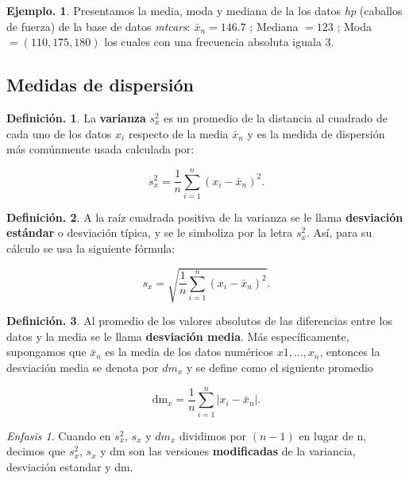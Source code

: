\documentclass[]{book}
\theoremstyle{definition}
\newtheorem{definition}{Definición.}[chapter]
\theoremstyle{definition}
\newtheorem{example}{Ejemplo.}[chapter]
\theoremstyle{definition}
\theoremstyle{remark}
\newtheorem*{remark}{Enfasis}
\begin{document}
\begin{example}
\protect\hypertarget{exm:unnamed-chunk-57}{}{\label{exm:unnamed-chunk-57} }Presentamos la media, moda y mediana de la los datos
\emph{hp} (caballos de fuerza) de la base de datos
\emph{mtcars}: \(\bar{x}_n= 146.7\) ; Mediana \(= 123\) ; Moda
\(=(110, 175, 180)\) los cuales con una
frecuencia absoluta iguala \(3\).
\end{example}

\hypertarget{medidas-de-dispersiuxf3n}{%
\subsection{Medidas de dispersión}\label{medidas-de-dispersiuxf3n}}

\begin{definition}
\protect\hypertarget{def:unnamed-chunk-58}{}{\label{def:unnamed-chunk-58} }
La \textbf{varianza} \(s_x^2\) es un promedio de la distancia
al cuadrado de cada uno de los
datos \(x_i\) respecto de la media \(\bar{x}_n\) y es la
medida de dispersión más comúnmente
usada calculada por:

\[s_x^2 = \frac{1}{n}\sum_{i=1}^{n} (x_i - \bar{x}_n)^2.
  \]
\end{definition}

\begin{definition}
\protect\hypertarget{def:unnamed-chunk-59}{}{\label{def:unnamed-chunk-59} }
A la raíz cuadrada positiva de la varianza se le llama
\textbf{desviación estándar} o
desviación típica, y se le simboliza por la letra
\(s_x^2\). Así, para su cálculo se usa la
siguiente fórmula:

\[s_x = \sqrt{ \frac{1}{n}\sum_{i=1}^{n} (x_i - 
                  \bar{x}_n)^2}.  \]
\end{definition}

\begin{definition}
\protect\hypertarget{def:unnamed-chunk-60}{}{\label{def:unnamed-chunk-60} }
Al promedio de los valores absolutos de las diferencias
entre los datos y la
media se le llama \textbf{desviación media}. Más
específicamente, supongamos que \(\bar{x}_n\)
es la media de los datos numéricos \(x1, \ldots , x_n\),
entonces la desviación media
se denota por \(dm_x\) y se define como el siguiente
promedio

\[\mbox{dm}_x = \frac{1}{n}\sum_{i=1}^{n} |x_i -
     \bar{x}_n|.  \]
\end{definition}

\begin{remark}
{}
Cuando en \(s_x^2\), \(s_x\) y \(dm_x\) dividimos por \((n-1)\)
en lugar de n, decimos que \(s_x^2\),
\(s_x\) y dm son las versiones \textbf{modificadas} de la
variancia, desviación estandar y dm.
\end{remark}
\end{document}
